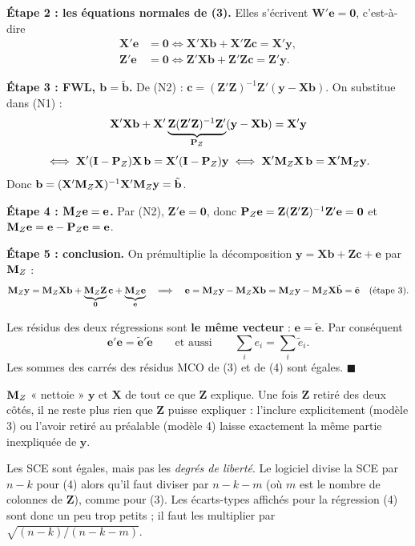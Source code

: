 \documentclass[11pt,a4paper]{article}
\newcommand{\vy}{\mathbf{y}}\newcommand{\vX}{\mathbf{X}}\newcommand{\vZ}{\mathbf{Z}}
\newcommand{\ve}{\mathbf{e}}\newcommand{\vb}{\mathbf{b}}\newcommand{\vc}{\mathbf{c}}
\begin{document}
\textbf{Étape 2 : les équations normales de (3).} Elles s'écrivent $\mathbf W'\ve=\mathbf 0$, c'est-à-dire
\begin{align}
\vX'\ve&=\mathbf 0 \iff \vX'\vX\vb+\vX'\vZ\vc=\vX'\vy, \tag{N1}\\
\vZ'\ve&=\mathbf 0 \iff \vZ'\vX\vb+\vZ'\vZ\vc=\vZ'\vy. \tag{N2}
\end{align}

\textbf{Étape 3 : FWL, $\vb=\tilde{\vb}$.} De (N2) : $\vc=(\vZ'\vZ)^{-1}\vZ'(\vy-\vX\vb)$. On substitue dans (N1) :
\[
\vX'\vX\vb+\vX'\underbrace{\vZ(\vZ'\vZ)^{-1}\vZ'}_{\Pz}(\vy-\vX\vb)=\vX'\vy
\]
\[
\iff \vX'(\I-\Pz)\vX\,\vb=\vX'(\I-\Pz)\vy
\iff \vX'\Mz\vX\,\vb=\vX'\Mz\vy .
\]
Donc $\vb=(\vX'\Mz\vX)^{-1}\vX'\Mz\vy=\tilde{\vb}$.

\textbf{Étape 4 : $\Mz\ve=\ve$.} Par (N2), $\vZ'\ve=\mathbf 0$, donc $\Pz\ve=\vZ(\vZ'\vZ)^{-1}\vZ'\ve=\mathbf 0$ et $\Mz\ve=\ve-\Pz\ve=\ve$.

\textbf{Étape 5 : conclusion.} On prémultiplie la décomposition $\vy=\vX\vb+\vZ\vc+\ve$ par $\mathbf{M}_Z$ :
\[
\Mz\vy=\Mz\vX\vb+\underbrace{\Mz\vZ}_{\mathbf 0}\vc+\underbrace{\Mz\ve}_{\ve}
\quad\Longrightarrow\quad
\ve=\Mz\vy-\Mz\vX\vb=\Mz\vy-\Mz\vX\tilde{\vb}=\tilde{\ve}\quad(\text{étape 3}).
\]

\begin{reponse}
Les résidus des deux régressions sont \textbf{le même vecteur} : $\ve=\tilde{\ve}$. Par conséquent
\[
\ve'\ve=\tilde{\ve}'\tilde{\ve}\qquad\text{et aussi}\qquad \textstyle\sum_i e_i=\sum_i\tilde e_i .
\]
Les sommes des carrés des résidus MCO de (3) et de (4) sont égales. \hfill$\blacksquare$
\end{reponse}

\begin{intuition}
$\mathbf{M}_Z$ « nettoie » $\vy$ et $\vX$ de tout ce que $\vZ$ explique. Une fois $\vZ$ retiré des deux côtés, il ne reste plus rien que $\vZ$ puisse expliquer : l'inclure explicitement (modèle 3) ou l'avoir retiré au préalable (modèle 4) laisse exactement la même partie inexpliquée de $\vy$.
\end{intuition}

\begin{attention}
Les SCE sont égales, mais pas les \emph{degrés de liberté}. Le logiciel divise la SCE par $n-k$ pour (4) alors qu'il faut diviser par $n-k-m$ (où $m$ est le nombre de colonnes de $\vZ$), comme pour (3). Les écarts-types affichés pour la régression (4) sont donc un peu trop petits ; il faut les multiplier par $\sqrt{(n-k)/(n-k-m)}$.
\end{attention}
\end{document}
